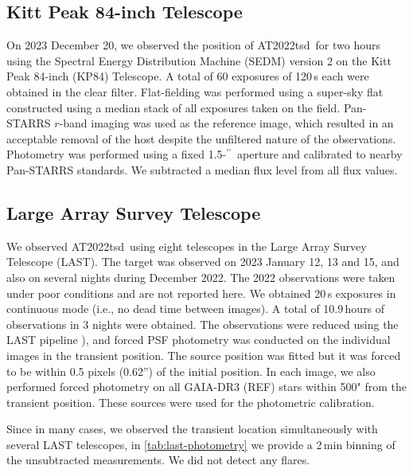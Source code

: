 \documentclass{nature_plusfigure}
\newcommand{\at}{AT2022tsd}
\newcommand{\ayqh}[1]{{\textcolor{red}{\texttt{AYQH: #1}}}}
\newcommand{\arcsec}{$^{\prime\prime}$}
\begin{document}
\begin{methods}
\subsection{Kitt Peak 84-inch Telescope}
\label{sec:kp84}

On 2023 December 20, we observed the position of \at\ for two hours using the Spectral Energy Distribution Machine (SEDM\cite{Blagorodnova2018}) version 2 on the Kitt Peak 84-inch (KP84) Telescope. A total of 60 exposures of 120\,s each were obtained in the clear filter. Flat-fielding was performed using a super-sky flat constructed using a median stack of all exposures taken on the field.  Pan-STARRS $r$-band imaging was used as the reference image, which resulted in an acceptable removal of the host despite the unfiltered nature of the observations.  Photometry was performed using a fixed 1.5-\arcsec\ aperture and calibrated to nearby Pan-STARRS standards. We subtracted a median flux level from all flux values.

\subsection{Large Array Survey Telescope}
\label{sec:last}

We observed \at\ using eight telescopes in the Large Array Survey Telescope (LAST\cite{Ofek2023,BenAmi2023}).
The target was observed on 2023 January 12, 13 and 15, and also on several nights during December 2022.
The 2022 observations were taken under poor conditions and are not reported here.
We obtained 20\,s exposures in continuous mode (i.e., no dead time between images).
A total of 10.9\,hours of observations in 3 nights were obtained.
The observations were reduced using the LAST pipeline \cite{Ofek2014,Ofek2019,Ofek2023}), and forced PSF photometry was conducted on the individual images
in the transient position. 
The source position was fitted but it was forced to be within 0.5 pixels (0.62'') of the initial position.
In each image, we also performed forced photometry on all GAIA-DR3 (REF) stars
within 500" from the transient position.
These sources were used for the photometric calibration.

Since in many cases, we observed the transient location simultaneously with several LAST telescopes, in \ref{tab:last-photometry} we provide a 2\,min binning of the unsubtracted measurements. We did not detect any flares.



\end{methods}
\end{document}
